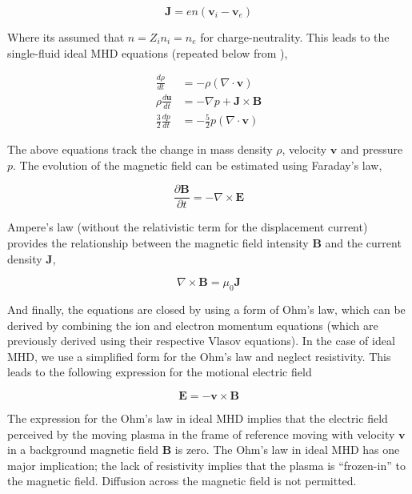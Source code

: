 \begin{equation}
    \mathbf{J} = en \left( \mathbf{v}_i - \mathbf{v}_e\right)
\end{equation}
 
Where its assumed that $n = Z_i n_i = n_e$ for charge-neutrality. This leads to the single-fluid ideal MHD equations (repeated below from ),

\begin{align}
    \frac{d\rho}{dt} &= -\rho \left( \nabla \cdot \mathbf{v} \right)\\
    \rho \frac{d\mathbf{u}}{dt} & = -\nabla p + \mathbf{J} \times \mathbf{B} \\
    \frac{3}{2}\frac{d p}{d t}  & = - \frac{5}{2} p \left(\nabla \cdot \mathbf{v} \right)
\end{align}

The above equations track the change in mass density $\rho$, velocity $\mathbf{v}$ and pressure $p$. The evolution of the magnetic field can be estimated using Faraday's law,

\begin{equation}
    \frac{\partial \mathbf{B}}{\partial t} = - \nabla \times \mathbf{E}    
\end{equation}

Ampere's law (without the relativistic term for the displacement current) provides the relationship between the magnetic field intensity $\mathbf{B}$ and the current density $\mathbf{J}$,

\begin{equation}
    \nabla \times \mathbf{B} = \mu_0 \mathbf{J}    
\end{equation}

And finally, the equations are closed by using a form of Ohm's law, which can be derived by combining the ion and electron momentum equations (which are previously derived using their respective Vlasov equations). In the case of ideal MHD, we use a simplified form for the Ohm's law and neglect resistivity. This leads to the following expression for the motional electric field 

\begin{equation}
    \mathbf{E} = -\mathbf{v} \times \mathbf{B}
\end{equation}

The expression for the Ohm's law in ideal MHD implies that the electric field perceived by the moving plasma in the frame of reference moving with velocity $\mathbf{v}$ in a background magnetic field $\mathbf{B}$ is zero. The Ohm's law in ideal MHD has one major implication; the lack of resistivity implies that the plasma is ``frozen-in'' to the magnetic field. Diffusion across the magnetic field is not permitted. 

